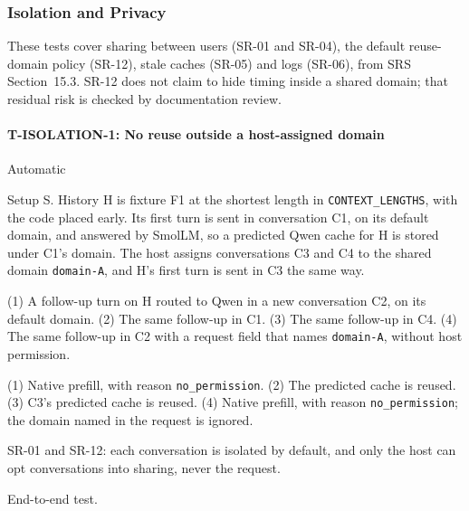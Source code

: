 \documentclass[12pt, titlepage]{article}
\newenvironment{testcase}[2]
  {\Needspace{8\baselineskip}\paragraph{#1: #2}\phantomsection\label{test:#1}\sloppy
   \begin{description}[style=sameline, leftmargin=3.6cm, labelwidth=3.4cm,
     font=\normalfont\bfseries, itemsep=2pt, topsep=2pt]}
  {\end{description}}
\newcommand{\cst}[1]{\texttt{#1}}
\begin{document}
\subsubsection{Isolation and Privacy}

These tests cover sharing between users (SR-01 and SR-04), the default
reuse-domain policy (SR-12), stale caches (SR-05) and logs (SR-06), from SRS
Section~15.3. SR-12 does not claim to hide timing inside a
shared domain; that residual risk is checked by documentation review.

\begin{testcase}{T-ISOLATION-1}{No reuse outside a host-assigned domain}
\item[Control] Automatic
\item[Initial state] Setup S. History H is fixture F1 at the shortest
length in \cst{CONTEXT\_LENGTHS}, with the code placed early. Its first turn
is sent in conversation C1, on its default domain, and answered by SmolLM, so
a predicted Qwen cache for H is stored under C1's domain. The host assigns
conversations C3 and C4 to the shared domain \texttt{domain-A}, and H's first
turn is sent in C3 the same way.
\item[Input] (1) A follow-up turn on H routed to Qwen in a new conversation
C2, on its default domain. (2) The same follow-up in C1. (3) The same
follow-up in C4. (4) The same follow-up in C2 with a request field that
names \texttt{domain-A}, without host permission.
\item[Output] (1) Native prefill, with reason \texttt{no\_permission}.
(2) The predicted cache is reused. (3) C3's predicted cache is reused.
(4) Native prefill, with reason \texttt{no\_permission}; the domain named in
the request is ignored.
\item[Derivation] SR-01 and SR-12: each conversation is isolated by default,
and only the host can opt conversations into sharing, never the request.
\item[How performed] End-to-end test.
\end{testcase}
\end{document}
